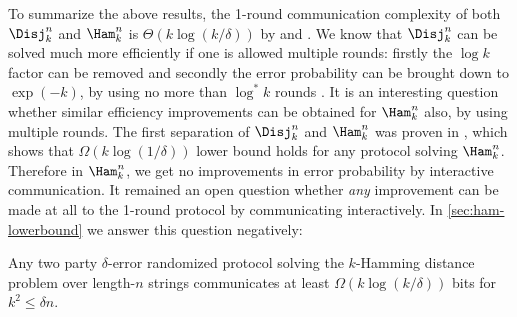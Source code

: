 

To summarize the above results, the 1-round communication 
complexity of both $\Disj^n_k$ and $\Ham^n_k$ is 
$\Theta(k\log(k/\delta))$ by 
\cite{BuhrmanGMW2012, Saglam2011, JayramW2011} and 
\cite{HuangSZZ2006}. We know that $\Disj^n_k$ can be solved 
much more efficiently if one is allowed multiple rounds:
firstly the $\log k$ factor can be removed \cite{HastadW2007} 
and secondly the error probability can be brought down to 
$\exp(-k)$, by using no more than $\log^* k$ rounds 
\cite{SaglamT2013}. It is an interesting question whether 
similar efficiency improvements can be obtained for $\Ham^n_k$ 
also, by using multiple rounds.
The first separation of $\Disj^n_k$ and $\Ham^n_k$ was proven
in \cite{BlaisBG2014}, which shows that $\Omega(k\log(1/\delta))$
lower bound holds for any protocol solving $\Ham^n_k$. 
Therefore in $\Ham^n_k$, we get no improvements in error probability
by interactive communication. It remained an open 
question whether {\em any} improvement can be made 
at all to the 1-round protocol by communicating interactively.
In \autoref{sec:ham-lowerbound} we answer this question negatively: 
\begin{theorem}
\label{thm:klogk}
Any two party $\delta$-error randomized protocol
solving the $k$-Hamming distance problem 
over length-$n$ strings communicates 
at least $\Omega(k\log (k/\delta))$ 
bits for $k^2\le \delta n$.
\end{theorem}